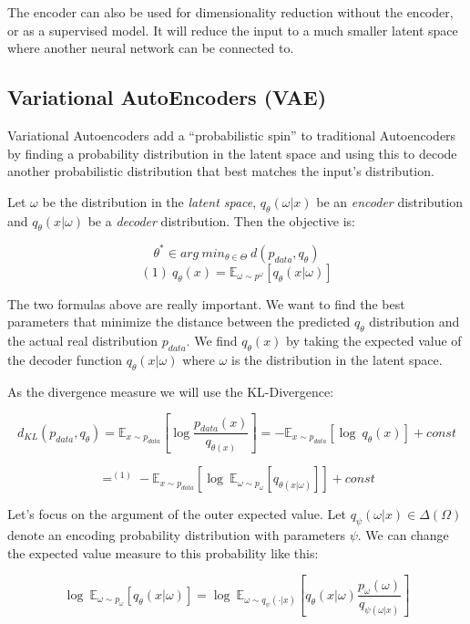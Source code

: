 \documentclass[11pt]{article}
\begin{document}
The encoder can also be used for dimensionality reduction without the
encoder, or as a supervised model. It will reduce the input to a much
smaller latent space where another neural network can be connected to.

\subsection{Variational AutoEncoders
(VAE)}\label{variational-autoencoders-vae}

Variational Autoencoders add a ``probabilistic spin'' to traditional
Autoencoders by finding a probability distribution in the latent space
and using this to decode another probabilistic distribution that best
matches the input's distribution.

Let \(\omega\) be the distribution in the \emph{latent space},
\(q_\theta(\omega|x)\) be an \emph{encoder} distribution and
\(q_\theta(x|\omega)\) be a \emph{decoder} distribution. Then the
objective is:

\[\theta^* \in arg\ min_{\theta \in \Theta}\ d(p_{data}, q_{\theta})\]
\[(1)\ q_\theta (x)=\mathbb{E}_{\omega \sim p^{\omega}}[q_\theta (x|\omega)]\]

The two formulas above are really important. We want to find the best
parameters that minimize the distance between the predicted \(q_\theta\)
distribution and the actual real distribution \(p_{data}\). We find
\(q_\theta(x)\) by taking the expected value of the decoder function
\(q_\theta(x|\omega)\) where \(\omega\) is the distribution in the
latent space.

As the divergence measure we will use the KL-Divergence:

\[d_{KL}(p_{data}, q_{\theta})=\mathbb{E}_{x\sim p_{data}}[\log \frac{p_{data}(x)}{q_{\theta (x)}}]=-\mathbb{E}_{x\sim p_{data}}[\log\ q_{\theta}(x)]+const\]

\[=^{(1)} -\mathbb{E}_{x\sim p_{data}}[\log\ \mathbb{E}_{\omega \sim p_{\omega}}[q_{\theta (x|\omega)}]]+const\]

Let's focus on the argument of the outer expected value. Let
\(q_\psi(\omega | x)\in \Delta (\Omega)\) denote an encoding probability
distribution with parameters \(\psi\). We can change the expected value
measure to this probability like this:

\[\log\ \mathbb{E}_{\omega \sim p_{\omega}}[q_{\theta} (x|\omega)]=\log\ \mathbb{E}_{\omega \sim q_\psi (\cdot|x)}[q_{\theta} (x|\omega)\frac{p_{\omega}(\omega)}{q_{\psi (\omega | x)}}]\]
\end{document}
